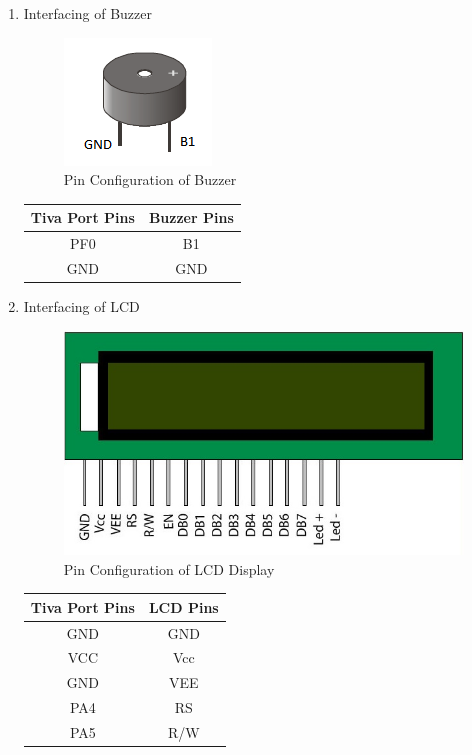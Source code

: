 \documentclass[a4paper,12pt,oneside]{book}
\begin{document}
\begin {enumerate}
\item Interfacing of Buzzer
\begin{figure}[h]
	\centering
	\includegraphics[scale=1]{speaker}
	\caption{Pin Configuration of Buzzer}
\end{figure}
\begin{center}
	\begin{tabular}{| c | c |}
		\hline
		\textbf{Tiva Port Pins} & \textbf{Buzzer Pins}\\
		\hline
		PF0 & B1\\
		\hline
		GND & GND\\
		\hline
	\end{tabular}
\end{center}
\newpage
\item Interfacing of LCD
\begin{figure}[h]
	\centering
	\includegraphics[scale=0.5]{lcd_pin}
	\caption{Pin Configuration of LCD Display}
\end{figure}
\begin{center}
	\begin{tabular}{| c | c |}
		\hline
		\textbf{Tiva Port Pins} & \textbf{LCD Pins}\\
		\hline
		GND & GND\\
		\hline
		VCC & Vcc\\
		\hline
		GND & VEE \\
		\hline
		PA4 & RS\\
		\hline
		PA5 & R/W \\

\end{tabular}
\end{center}
\end{enumerate}
\end{document}
